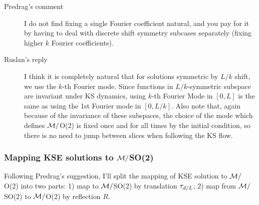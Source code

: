 \begin{description}
\item[Predrag's comment] I do not find fixing a single
Fourier coefficient natural, and you pay for it by having to
deal with discrete shift symmetry subcases separately (fixing
higher $k$ Fourier coefficients).
\item[Ruslan's reply] I think it is completely natural that
for solutions symmetric by $L/k$ shift, we use the $k$-th
Fourier mode. Since functions in $L/k$-symmetric subspace are
invariant under KS dynamics, using $k$-th Fourier Mode in
$[0, L]$ is the same as using the 1st Fourier mode in $[0,
L/k]$.  Also note that, again because of the invariance of
these subspaces, the choice of the mode which defines
${\cal M}/$O(2) is fixed once and for all times by the initial
condition, so there is no need to jump between slices when
following the KS flow.
\end{description}

\subsubsection{Mapping KSE solutions to ${\cal M}/$SO(2)}

Following Predrag's suggestion, I'll split the mapping of KSE solution to ${\cal M}/$O(2) into two parts:
1) map to ${\cal M}/$SO(2) by translation $\tau_{d/L}$; 2) map from ${\cal M}/$SO(2) to ${\cal M}/$O(2) by reflection $R$.

\medskip{}



%
%
%
%
%
%
%
%
%
%
%
%
%
%
%
%
%
%
%

